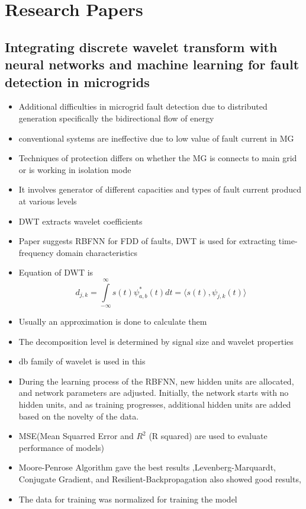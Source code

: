 \documentclass[14pt ,a4paper]{extarticle}
\begin{document}
\section{ Research Papers }

\subsection{Integrating discrete wavelet transform with neural networks and machine
learning for fault detection in microgrids}

\begin{itemize}
    \item{Additional difficulties in microgrid fault detection due to distributed generation specifically the bidirectional flow of energy} 
    \item{conventional systems are ineffective due to low value of fault current in MG}
    \item{Techniques of protection differs on whether the MG is connects to main grid or is working in isolation mode}
    \item{It involves generator of different capacities and types of fault current producd at various levels}
    \item{DWT extracts wavelet coefficients}

    \item{Paper suggests RBFNN for FDD of faults, DWT is used for extracting time-frequency domain characteristics}
    \item{Equation of DWT is 
            $$
            d_{j,k} = \int \limits_{- \infty}^{ \infty } s(t)\psi^*_{a,b}(t)dt = \langle{s(t), \psi_{j,k}(t) } \rangle 
            $$
        }
    \item{Usually an approximation is done to calculate them }
    \item{The decomposition level is determined by signal size and wavelet properties}
    \item{db family of wavelet is used in this}
    \item{During the learning
process of the RBFNN, new hidden units are allocated, and network
parameters are adjusted. Initially, the network starts with no hidden
units, and as training progresses, additional hidden units are added
based on the novelty of the data. }
\item{MSE(Mean Squarred Error and $R^2$ (R squared) are used to evaluate performance of models)}
    
\item{Moore-Penrose Algorithm gave the best results ,Levenberg-Marquardt, Conjugate Gradient, and Resilient-Backpropagation also showed good results,}

\item{The data for training was normalized for training the model}
\end{itemize}
\end{document}
